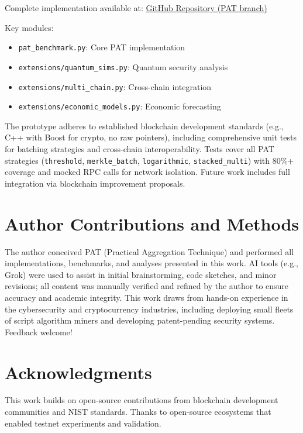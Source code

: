 \documentclass[iacr,final]{iacrtrans}
\begin{document}
Complete implementation available at: \href{https://github.com/odenrider/dogecoin/tree/pat-aggregation-prototype/pat}{GitHub Repository (PAT branch)}

Key modules:

\begin{itemize}
    \item \texttt{pat\_benchmark.py}: Core PAT implementation
    \item \texttt{extensions/quantum\_sims.py}: Quantum security analysis
    \item \texttt{extensions/multi\_chain.py}: Cross-chain integration
    \item \texttt{extensions/economic\_models.py}: Economic forecasting
\end{itemize}

The prototype adheres to established blockchain development standards (e.g., C++ with Boost for crypto, no raw pointers), including comprehensive unit tests for batching strategies and cross-chain interoperability. Tests cover all PAT strategies (\texttt{threshold}, \texttt{merkle\_batch}, \texttt{logarithmic}, \texttt{stacked\_multi}) with 80\%+ coverage and mocked RPC calls for network isolation. Future work includes full integration via blockchain improvement proposals.
\section{Author Contributions and Methods}
\label{sec:author_contributions}

The author conceived PAT (Practical Aggregation Technique) and performed all implementations, benchmarks, and analyses presented in this work. AI tools (e.g., Grok) were used to assist in initial brainstorming, code sketches, and minor revisions; all content was manually verified and refined by the author to ensure accuracy and academic integrity. This work draws from hands-on experience in the cybersecurity and cryptocurrency industries, including deploying small fleets of script algorithm miners and developing patent-pending security systems. Feedback welcome!
\section{Acknowledgments}
\label{sec:acknowledgments}

This work builds on open-source contributions from blockchain development communities and NIST standards. Thanks to open-source ecosystems that enabled testnet experiments and validation.
\end{document}
